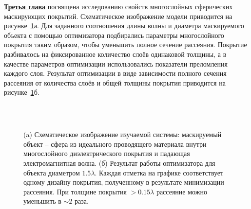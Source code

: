 \underline{\textbf{Третья глава}} посвящена исследованию свойств
многослойных сферических маскирующих покрытий. Схематическое
изображение модели приводится на рисунке~\ref{img:scattering}а. Для
заданного соотношения длины волны и диаметра маскируемого объекта с
помощью оптимизатора подбирались параметры многослойного покрытия
таким образом, чтобы уменьшить полное сечение рассеяния.  Покрытие
разбивалось на фиксированное количество слоёв одинаковой толщины, а в
качестве параметров оптимизации использовались показатели преломления
каждого слоя.  Результат оптимизации в виде зависимости полного
сечения рассеяния от количества слоёв и общей толщины покрытия
приводится на рисунке~\ref{img:scattering}б.
\begin{figure}[t]
  \begin{minipage}[ht]{0.45\linewidth}        
  \end{minipage}
  \hfill
  \begin{minipage}[ht]{0.54\linewidth}
  \end{minipage}\\
  \vspace{0.3em}\\
  \begin{minipage}[ht]{0.45\linewidth}        
  \end{minipage}
  \hfill
  \begin{minipage}[ht]{0.54\linewidth}
  \end{minipage}

  \caption{(a) Схематическое изображение изучаемой системы: маскируемый
    объект -- сфера из идеального проводящего материала внутри
    многослойного диэлектрического покрытия и падающая
    электромагнитная волна. (б) 
    Результат работы оптимизатора для объекта диаметром $1.5\lambda$.
    Каждая отметка на графике соответствует одному дизайну покрытия,
    полученному в результате минимизации рассеяния. При толщине
    покрытия $>0.15\lambda$ рассеяние можно уменьшить в $\sim 2$
    раза.}
  \label{img:scattering}  
\end{figure}

